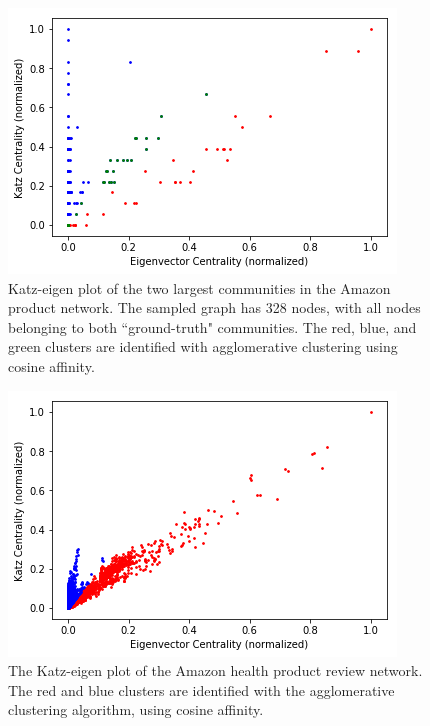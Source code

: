 \documentclass{IEEEtran}
\begin{document}
	\begin{figure}
		\centering
		\includegraphics[width=0.98\linewidth]{amazon_product.png}
		\caption{Katz-eigen plot of the two largest communities in the Amazon product network. The sampled graph has 328 nodes, with all nodes belonging to both ``ground-truth" communities. The red, blue, and green clusters are identified with agglomerative clustering using cosine affinity.}
		\label{fig:amazon_product}
	\end{figure}
	
	\begin{figure}
		\centering
		\includegraphics[width=0.98\linewidth]{amazon_health_clustered.png}
		\caption{The Katz-eigen plot of the Amazon health product review network. The red and blue clusters are identified with the agglomerative clustering algorithm, using cosine affinity.}
		\label{fig:amazon_health}
	\end{figure}
	
\end{document}
